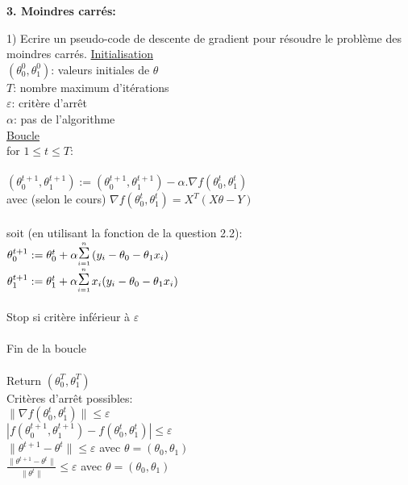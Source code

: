 \vspace{5mm}

{\fontsize{12pt}{22pt} \textbf{3. Moindres carrés:}\par}

\vspace{5mm}

1) Ecrire un pseudo-code de descente de gradient pour résoudre le problème des moindres carrés.  \vspace{2mm}
\underline{Initialisation} \\
$(\theta_0^0, \theta_1^0)$: valeurs initiales de $\theta$ \\
$T$: nombre maximum d'itérations \\
$\varepsilon$: critère d'arrêt \\
$\alpha$: pas de l'algorithme \\

\underline{Boucle} \\
for $1 \leq t \leq T$: \\ \\
\phantom{a} \hspace{4mm} $(\theta_0^{t+1}, \theta_1^{t+1}) := (\theta_0^{t+1}, \theta_1^{t+1}) - \alpha . \nabla f(\theta_0^{t}, \theta_1^{t})$ \\
\phantom{a} \hspace{4mm} avec (selon le cours) $\nabla f(\theta_0^{t}, \theta_1^{t}) = X^T (X \theta - Y)$ \\ \\
\phantom{a} \hspace{4mm} soit (en utilisant la fonction de la question 2.2): \\
\phantom{a} \hspace{4mm} $\theta_0^{t+1} := \theta_0^t + \alpha \ssumm{i=1}{n} (y_i - \theta_0 - \theta_1 x_i)$ \\
\phantom{a} \hspace{4mm} $\theta_1^{t+1} := \theta_1^t + \alpha \ssumm{i=1}{n} x_i (y_i - \theta_0 - \theta_1 x_i)$ \\ \\
\phantom{a} \hspace{4mm} Stop si critère inférieur à $\varepsilon$ \\ \\
Fin de la boucle \\ \\
Return $(\theta_0^T, \theta_1^T)$ \\

Critères d'arrêt possibles: \\
$\| \nabla f(\theta_0^{t}, \theta_1^{t}) \| \leq \varepsilon$ \\
$| f(\theta_0^{t+1}, \theta_1^{t+1}) - f(\theta_0^{t}, \theta_1^{t}) | \leq \varepsilon$ \\
$ \| \theta^{t+1} - \theta^{t} \| \leq \varepsilon$ \hspace{5mm} avec $\theta = (\theta_0, \theta_1)$ \\
$ \frac{\| \theta^{t+1} - \theta^{t} \|}{\| \theta^{t} \|} \leq \varepsilon$ \hspace{5mm} avec $\theta = (\theta_0, \theta_1)$
\vspace{5mm}


